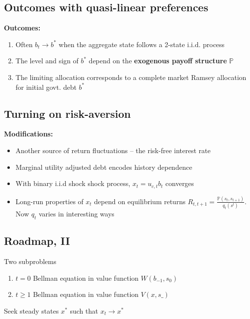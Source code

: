 \documentclass[12pt]{article}
\begin{document}
\subsection{Outcomes with quasi-linear preferences}
 \textbf{Outcomes:}
 \begin{enumerate}
  \item  Often $b_t\to b^*$ when the aggregate state follows a 2-state i.i.d. process
  \item The level  and sign of $b^*$ depend on the \textbf{exogenous payoff structure} $\mathbb{P}$
  \item The limiting allocation corresponds to a complete market Ramsey allocation for initial govt. debt $b^*$
 \end{enumerate}
 
 
 \subsection{Turning on risk-aversion}
  \textbf{Modifications:}
  \begin{itemize}
  \item Another source of return fluctuations -- the risk-free interest rate
   \item Marginal utility adjusted debt  encodes history dependence
   \item  With binary i.i.d shock shock process,  $x_t=u_{c,t}b_{t}$  converges

   \item Long-run properties of $x_t$ depend on equilibrium returns $R_{t,t+1}=\frac{\mathbb{P}(s_t,s_{t+1})}{q_t(s^t)}$.
   Now $q_t$ varies in interesting ways


  \end{itemize}
  
  
  
\subsection{Roadmap, II}


 Two subproblems
\begin{enumerate}
 \item  $t=0$ Bellman equation in value function $W(b_{-1},s_0)$ %
 \item  $t\geq 1$ Bellman equation in value function $V(x,s\_)$
\end{enumerate}

Seek steady states $x^*$ such that $x_t \to x^*$
\end{document}
